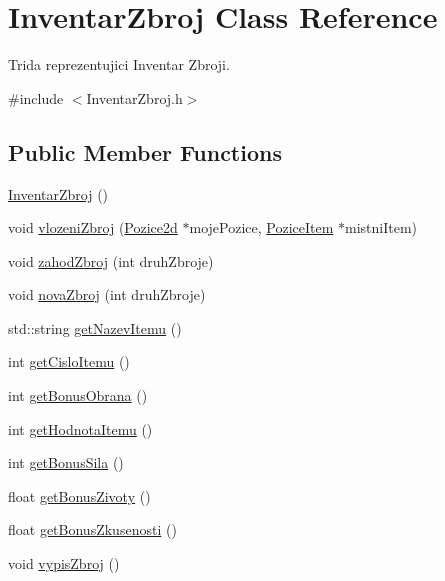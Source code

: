 \hypertarget{class_inventar_zbroj}{\section{Inventar\-Zbroj Class Reference}
\label{class_inventar_zbroj}
}


Trida reprezentujici Inventar Zbroji.  




{\ttfamily \#include $<$Inventar\-Zbroj.\-h$>$}

\subsection*{Public Member Functions}
\begin{DoxyCompactItemize}
\item 
\hyperlink{class_inventar_zbroj_afc49428ae1367838635c00439d060e41}{Inventar\-Zbroj} ()
\item 
void \hyperlink{class_inventar_zbroj_ae9cb1a32f705afa700185f489d45eeef}{vlozeni\-Zbroj} (\hyperlink{struct_pozice2d}{Pozice2d} $\ast$moje\-Pozice, \hyperlink{class_pozice_item}{Pozice\-Item} $\ast$mistni\-Item)
\item 
void \hyperlink{class_inventar_zbroj_ad663783ee8a2dc9064b5d75e2a8599b5}{zahod\-Zbroj} (int druh\-Zbroje)
\item 
void \hyperlink{class_inventar_zbroj_ad29ae308b3f77beaa85060c7eb4f837e}{nova\-Zbroj} (int druh\-Zbroje)
\item 
std\-::string \hyperlink{class_inventar_zbroj_a029b2828d77e4802b8c91abbb971afd3}{get\-Nazev\-Itemu} ()
\item 
int \hyperlink{class_inventar_zbroj_af7742f89dd27203c398eb9faababef5c}{get\-Cislo\-Itemu} ()
\item 
int \hyperlink{class_inventar_zbroj_a9120ac5222b2aa739feddf6ccdb7c8fe}{get\-Bonus\-Obrana} ()
\item 
int \hyperlink{class_inventar_zbroj_ac103ffc2c2c398098f225366e30822b8}{get\-Hodnota\-Itemu} ()
\item 
int \hyperlink{class_inventar_zbroj_a269a2c1ee91c1c2b08d8b4bc48f17146}{get\-Bonus\-Sila} ()
\item 
float \hyperlink{class_inventar_zbroj_aa84e609d3e8c98796943eeb7a4a61dd5}{get\-Bonus\-Zivoty} ()
\item 
float \hyperlink{class_inventar_zbroj_a7f598ed27815c62b687367155df254d6}{get\-Bonus\-Zkusenosti} ()
\item 
void \hyperlink{class_inventar_zbroj_a6f74ecfadb7253ad6cb913cbee5b6ff0}{vypis\-Zbroj} ()
\end{DoxyCompactItemize}
